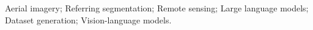 \acresetall
\noindent Aerial imagery; Referring segmentation; Remote sensing; Large language models; Dataset generation; Vision-language models.